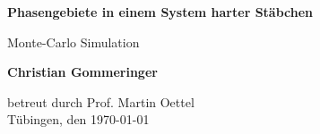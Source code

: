 \documentclass[12pt]{article}
\begin{document}
\begin{titlepage}
    \begin{center}
        \vspace*{1cm}
            
        \Huge
        \textbf{Phasengebiete in einem System harter Stäbchen}
            
        
        \large
        
            
        \vspace{0.7cm}
            Monte-Carlo Simulation
        \vspace{2cm}
        

        \textbf{Christian Gommeringer}
            
        \vspace*{7cm}
        
        
            
        
              
        
            
        
            
        \normalsize
        betreut durch Prof. Martin Oettel\\
        \vspace*{1cm}
        Tübingen, den \today
        
            
    \end{center}
\end{titlepage}
\end{document}
